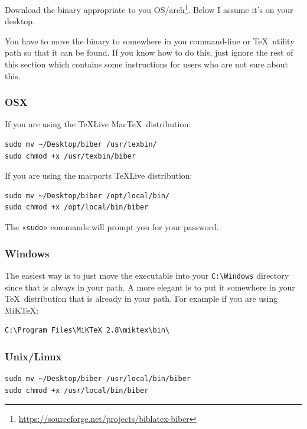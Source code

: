 \documentclass{ltxdockit}
\begin{document}
Download the binary appropriate to you
OS/arch\footnote{\url{https://sourceforge.net/projects/biblatex-biber}}. Below
I assume it's on your desktop.

You have to move the binary to somewhere in you command-line or \TeX\ utility
path so that it can be found. If you know how to do this, just ignore the
rest of this section which contains some instructions for users who are
not sure about this.

\subsubsection{OSX}

If you are using the \TeX Live Mac\TeX\ distribution:

\begin{verbatim}
sudo mv ~/Desktop/biber /usr/texbin/
sudo chmod +x /usr/texbin/biber
\end{verbatim}

\noindent If you are using the macports \TeX Live distribution:

\begin{verbatim}
sudo mv ~/Desktop/biber /opt/local/bin/
sudo chmod +x /opt/local/bin/biber
\end{verbatim}

\noindent The «\verb+sudo+» commands will prompt you for your password.

\subsubsection{Windows}

The easiest way is to just move the executable into your \verb+C:\Windows+ directory since
that is always in your path. A more elegant is to put it somewhere in
your \TeX\ distribution that is already in your path. For example if you
are using MiK\TeX:

\begin{verbatim}
C:\Program Files\MiKTeX 2.8\miktex\bin\
\end{verbatim}

\subsubsection{Unix/Linux}

\begin{verbatim}
sudo mv ~/Desktop/biber /usr/local/bin/biber
sudo chmod +x /usr/local/bin/biber
\end{verbatim}
\end{document}

